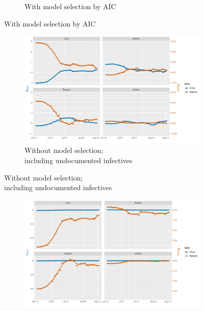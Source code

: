 \documentclass[12pt]{article}
\begin{document}
\begin{appendices}
\begin{figure}[H]
\begin{subfigure}{\textwidth}
    	      \caption{With model selection by AIC}
    	      \label{fig:beta_between_over_time_centro_aic}
    	    \end{subfigure}
    	\end{figure}
        \begin{figure}[H]\ContinuedFloat
    	    \begin{subfigure}{\textwidth}
    	      \centering
    	      \includegraphics[width=\linewidth]{output/model_between_lag14_betas_Centro (IT)_UndocQuadratic_rolling.pdf}
    	      \caption{Without model selection; \\ including undocumented infectives}
    	      \label{fig:beta_between_over_time_centro_regular_undoc}
    	    \end{subfigure}
        \end{figure}
        \begin{figure}[H]\ContinuedFloat
    	    \begin{subfigure}{\textwidth}
    	      \centering
    	      \includegraphics[width=\linewidth]{output/model_between_lag14_betas_Centro (IT)_aic_UndocQuadratic_rolling.pdf}

\end{subfigure}
\end{figure}
\end{appendices}
\end{document}
